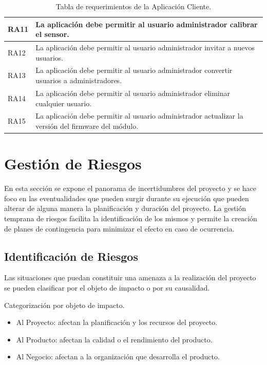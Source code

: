 \begin{table}[ht]
\begin{tabular}{|l|m{12cm}|}
			RA11                              & La aplicación debe permitir al usuario administrador calibrar el sensor.                                  \\ \hline
			RA12                              & La aplicación debe permitir al usuario administrador invitar a nuevos usuarios.                           \\ \hline
			RA13                              & La aplicación debe permitir al usuario administrador convertir usuarios a administradores.                \\ \hline
			RA14                              & La aplicación debe permitir al usuario administrador eliminar cualquier usuario.                          \\ \hline
			RA15                              & La aplicación debe permitir al usuario administrador actualizar la versión del firmware del módulo.       \\ \hline
		\end{tabular}
	\caption[Requerimientos de la Aplicación]{Tabla de requerimientos de la Aplicación Cliente.}
	\label{table:req_aplicacion}
\end{table}

\section{Gestión de Riesgos}
En esta sección se expone el panorama de incertidumbres del proyecto y se hace foco en las eventualidades que pueden surgir durante su ejecución que pueden alterar de alguna manera la planificación y duración del proyecto.
La gestión temprana de riesgos facilita la identificación de los mismos y permite la creación de planes de contingencia para minimizar el efecto en caso de ocurrencia.

\subsection{Identificación de Riesgos}
Las situaciones que puedan constituir una amenaza a la realización del proyecto se pueden clasificar por el objeto de impacto o por su causalidad.

Categorización por objeto de impacto.
\begin{itemize}
	\item Al Proyecto: afectan la planificación y los recursos del proyecto.
	\item Al Producto: afectan la calidad o el rendimiento del producto.
	\item Al Negocio: afectan a la organización que desarrolla el producto.
\end{itemize}


